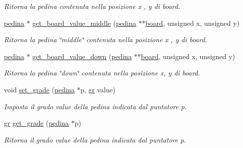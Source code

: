 \begin{DoxyCompactItemize}
\begin{DoxyCompactList}\small\item\em Ritorna la {\itshape pedina} contenuta nella posizione {\itshape x} , {\itshape y} di {\itshape board}. \end{DoxyCompactList}\item 
\hyperlink{ml__lib_8h_a71fee95122b31f5cb0b07d9c16ffa3a5}{pedina} $\ast$ \hyperlink{group__Ausiliarie_ga59156018c085ef9af6563790b63c28d5}{get\+\_\+board\+\_\+value\+\_\+middle} (\hyperlink{ml__lib_8h_a71fee95122b31f5cb0b07d9c16ffa3a5}{pedina} $\ast$$\ast$\hyperlink{ml__main_8c_a62a3fe3d1df9ff58883b669f7f24e516}{board}, unsigned x, unsigned y)
\begin{DoxyCompactList}\small\item\em Ritorna la {\itshape pedina} \char`\"{}middle\char`\"{} contenuta nella posizione {\itshape x} , {\itshape y} di {\itshape board}. \end{DoxyCompactList}\item 
\hyperlink{ml__lib_8h_a71fee95122b31f5cb0b07d9c16ffa3a5}{pedina} $\ast$ \hyperlink{group__Ausiliarie_gae874c64d588c5865633fc342fbbbafaa}{get\+\_\+board\+\_\+value\+\_\+down} (\hyperlink{ml__lib_8h_a71fee95122b31f5cb0b07d9c16ffa3a5}{pedina} $\ast$$\ast$\hyperlink{ml__main_8c_a62a3fe3d1df9ff58883b669f7f24e516}{board}, unsigned x, unsigned y)
\begin{DoxyCompactList}\small\item\em Ritorna la {\itshape pedina} \char`\"{}down\char`\"{} contenuta nella posizione {\itshape x}, {\itshape y} di {\itshape board}. \end{DoxyCompactList}\item 
void \hyperlink{group__Ausiliarie_ga663d3a2fcf86042d03eb834766b7adea}{set\+\_\+grade} (\hyperlink{ml__lib_8h_a71fee95122b31f5cb0b07d9c16ffa3a5}{pedina} $\ast$p, \hyperlink{ml__lib_8h_a25f6e8adc446355e3f42092ecf9d598c}{gr} value)
\begin{DoxyCompactList}\small\item\em Imposta il grado {\itshape value} della pedina indicata dal puntatore {\itshape p}. \end{DoxyCompactList}\item 
\hyperlink{ml__lib_8h_a25f6e8adc446355e3f42092ecf9d598c}{gr} \hyperlink{group__Ausiliarie_ga6ceb2e2fb4d39456d2b64b64f4841c67}{get\+\_\+grade} (\hyperlink{ml__lib_8h_a71fee95122b31f5cb0b07d9c16ffa3a5}{pedina} $\ast$p)
\begin{DoxyCompactList}\small\item\em Ritorna il grado {\itshape value} della pedina indicata dal puntatore {\itshape p}. \end{DoxyCompactList}\end{DoxyCompactItemize}


